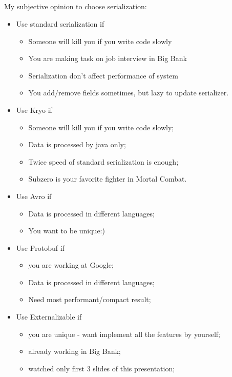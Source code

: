 \documentclass[8pt]{beamer}
\begin{document}
\subsection{\partname}
\begin{frame}[fragile]{\partname}

My subjective opinion to choose serialization:
\begin{itemize}
  \item<1-> Use standard serialization if {
    \begin{itemize}
      \item<1-> Someone will kill you if you write code slowly
      \item<2-> You are making task on job interview in Big Bank
      \item<3-> Serialization don't affect performance of system
      \item<4-> You add/remove fields sometimes, but lazy to update serializer.
    \end{itemize}
  }
  \item<5-> Use Kryo if {
    \begin{itemize}
      \item<6-> Someone will kill you if you write code slowly;
      \item<7-> Data is processed by java only;
      \item<8-> Twice speed of standard serialization is enough;
      \item<9-> Subzero is your favorite fighter in Mortal Combat.
    \end{itemize}
  }


  \item<10-> Use Avro if {
    \begin{itemize}
      \item<11-> Data is processed in different languages;
      \item<12-> You want to be unique:)
    \end{itemize}
  }

  \item<10-> Use Protobuf if {
    \begin{itemize}
      \item<11-> you are working at Google;
      \item<12-> Data is processed in different languages;
      \item<13-> Need most performant/compact result;
    \end{itemize}
  }

  \item<14-> Use Externalizable if {
    \begin{itemize}
      \item<15-> you are unique - want implement all the features by yourself;
      \item<16-> already working in Big Bank;
      \item<17-> watched only first 3 slides of this presentation;
    \end{itemize}
  }


\end{itemize}
\end{frame}
\end{document}
